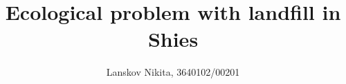 \documentclass{beamer}
\title{Ecological problem with landfill in Shies}
\author{Lanskov Nikita, 3640102/00201}
\begin{document}
\frame{
    \titlepage
}
\end{document}
